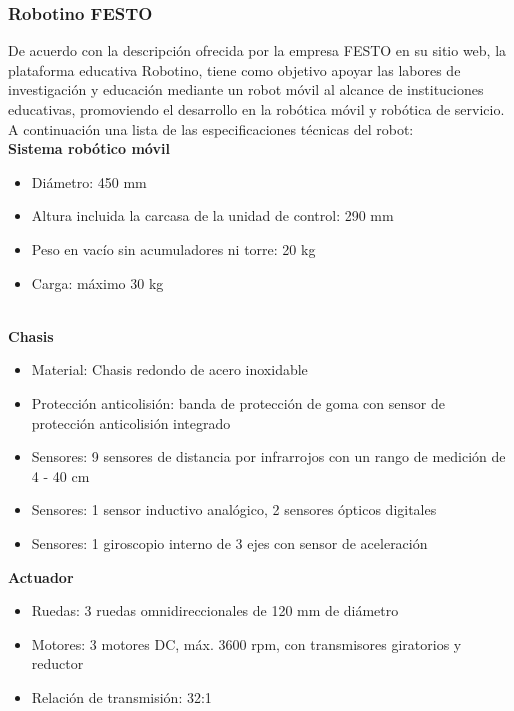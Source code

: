             \subsubsection{Robotino FESTO}
            De acuerdo con la descripción ofrecida por la empresa FESTO en su sitio web, la plataforma educativa Robotino, tiene como objetivo apoyar las labores de investigación y educación mediante un robot móvil al alcance de instituciones educativas, promoviendo el desarrollo en la robótica móvil y robótica de servicio. A continuación una lista de las especificaciones técnicas del robot:
            \phantom{saltodelineaforzado >:D}\\
            
            \textbf{Sistema robótico móvil}
            \begin{itemize}
                \item Diámetro: 450 mm
                \item Altura incluida la carcasa de la unidad de control: 290 mm
                \item Peso en vacío sin acumuladores ni torre: 20 kg
                \item Carga: máximo 30 kg
            \end{itemize}
            
            \phantom{saltodelineaforzado >:D}\\
            
            \textbf{Chasis}
            \begin{itemize}
                \item Material: Chasis redondo de acero inoxidable
                \item Protección anticolisión: banda de protección de goma con sensor de protección anticolisión integrado
                \item Sensores: 9 sensores de distancia por infrarrojos con un rango de medición de 4 - 40 cm
                \item Sensores: 1 sensor inductivo analógico, 2 sensores ópticos digitales
                \item Sensores: 1 giroscopio interno de 3 ejes con sensor de aceleración
            \end{itemize}\newpage
            
            \textbf{Actuador}
            \begin{itemize}
                \item Ruedas: 3 ruedas omnidireccionales de 120 mm de diámetro
                \item Motores: 3 motores DC, máx. 3600 rpm, con transmisores giratorios y reductor
                \item Relación de transmisión: 32:1
            \end{itemize}

